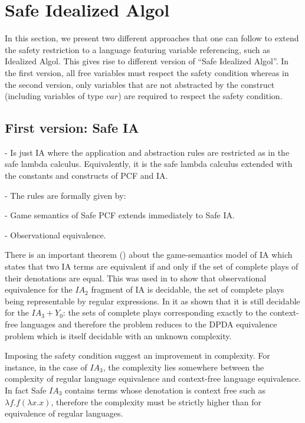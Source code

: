 


\section{Safe Idealized Algol}

In this section, we present two different approaches that one can
follow to extend the safety restriction to a language featuring
variable referencing, such as Idealized Algol. This gives rise to
different version of ``Safe Idealized Algol''. In the first version,
all free variables must respect the safety condition whereas in the
second version, only variables that are not abstracted by the
\ianewvar construct (including variables of type $var$) are required
to respect the safety condition.


\subsection{First version: Safe IA}
- Is just IA where the application and abstraction rules are
restricted as in the safe lambda calculus. Equivalently, it is the
safe lambda calculus extended with the constants and constructs of
PCF and IA.

- The rules are formally given by:


- Game semantics of Safe PCF extends immediately to Safe IA.

- Observational equivalence.

There is an important theorem (\cite{AM97a}) about the
game-semantics model of IA which states that two IA terms are
equivalent if and only if the set of complete plays of their
denotations are equal. This was used in \cite{ghicamccusker00} to
show that observational equivalence for the $IA_2$ fragment of IA is
decidable, the set of complete plays being representable by regular
expressions. In \cite{Ong02} it as shown that it is still decidable
 for the $IA_3+Y_0$: the sets of complete plays corresponding exactly to the context-free languages
 and therefore the problem reduces to the DPDA equivalence problem which is itself decidable with an unknown
complexity.

Imposing the safety condition suggest an improvement in complexity.
For instance, in the case of $IA_3$, the complexity lies somewhere
between the complexity of regular language equivalence and
context-free language equivalence. In fact Safe $IA_3$ contains
terms whose denotation is context free such as $\lambda f . f
(\lambda x .x )$, therefore the complexity must be strictly higher
than for equivalence of regular languages.



